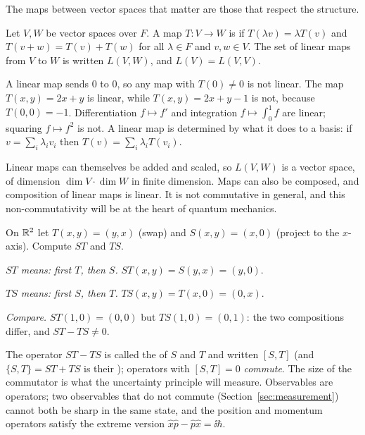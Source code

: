 The maps between vector spaces that matter are those that respect the structure.

\begin{definition}\label{def:linmap}
  Let $V,W$ be vector spaces over $F$. A map $T:V\to W$ is  if $T(\lambda v)=\lambda T(v)$ and $T(v+w)=T(v)+T(w)$ for all $\lambda\in F$ and $v,w\in V$. The set of linear maps from $V$ to $W$ is written $L(V,W)$, and $L(V)=L(V,V)$.
\end{definition}

A linear map sends $0$ to $0$, so any map with $T(0)\neq0$ is not linear. The map $T(x,y)=2x+y$ is linear, while $T(x,y)=2x+y-1$ is not, because $T(0,0)=-1$. Differentiation $f\mapsto f'$ and integration $f\mapsto\int_0^1f$ are linear; squaring $f\mapsto f^2$ is not. A linear map is determined by what it does to a basis: if $v=\sum_i\lambda_iv_i$ then $T(v)=\sum_i\lambda_iT(v_i)$.

Linear maps can themselves be added and scaled, so $L(V,W)$ is a vector space, of dimension $\dim V\cdot\dim W$ in finite dimension. Maps can also be composed, and composition of linear maps is linear. It is not commutative in general, and this non-commutativity will be at the heart of quantum mechanics.

\begin{example}\label{ex:noncommuting}
  On $\mathbb{R}^2$ let $T(x,y)=(y,x)$ (swap) and $S(x,y)=(x,0)$ (project to the $x$-axis). Compute $ST$ and $TS$.
\end{example}
\begin{solution}
  \begin{steps}
    \item \emph{$ST$ means: first $T$, then $S$.} $ST(x,y)=S(y,x)=(y,0)$.
    \item \emph{$TS$ means: first $S$, then $T$.} $TS(x,y)=T(x,0)=(0,x)$.
    \item \emph{Compare.} $ST(1,0)=(0,0)$ but $TS(1,0)=(0,1)$: the two compositions differ, and $ST-TS\neq0$.
  \end{steps}
\end{solution}

\begin{lookahead}
  The operator $ST-TS$ is called the  of $S$ and $T$ and written $[S,T]$ (and $\{S,T\}=ST+TS$ is their ); operators with $[S,T]=0$ \emph{commute}. The size of the commutator is what the uncertainty principle will measure. Observables are operators; two observables that do not commute (Section~\ref{sec:measurement}) cannot both be sharp in the same state, and the position and momentum operators satisfy the extreme version $\hat x\hat p-\hat p\hat x=\ii\hbar$.
\end{lookahead}

